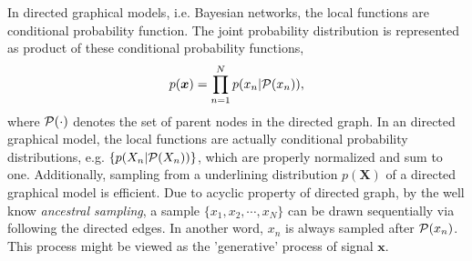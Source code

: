 In directed graphical models, i.e. Bayesian networks, the local functions are conditional probability function. The joint probability distribution is represented as product of these conditional probability functions,
\begin{equation}
  p(\bm{x}) = \prod_{n=1}^{N}p(x_n| \mathcal{P}(x_n)),
\end{equation}
where $\mathcal{P}(\cdot)$ denotes the set of parent nodes in the directed graph. In an directed graphical model, the local functions are actually conditional probability distributions, e.g. $\{p(X_n| \mathcal{P}(X_n))\}$, which are properly normalized and sum to one. Additionally, sampling from a underlining distribution $p(\bm{X})$ of a directed graphical model is efficient. Due to acyclic property of directed graph, by the well know \textit{ancestral sampling}, a sample $\{x_1, x_2, \cdots, x_N\}$ can be drawn sequentially via following the directed edges. In another word, $x_n$ is always sampled after $\mathcal{P}(x_n)$. This process might be viewed as the 'generative' process of signal $\bm{x}$.

